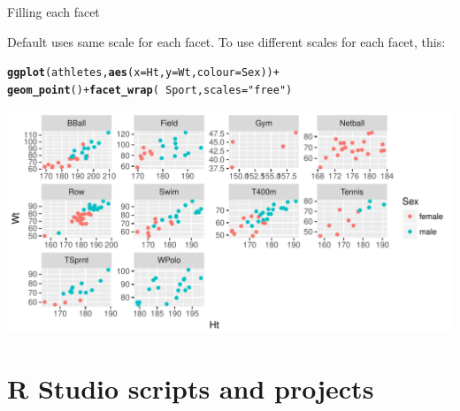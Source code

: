 \documentclass[unknownkeysallowed]{beamer}\usepackage[]{graphicx}\usepackage[]{color}
\makeatletter
\def\maxwidth{ %
  \ifdim\Gin@nat@width>\linewidth
    \linewidth
  \else
    \Gin@nat@width
  \fi
}
\newcommand{\hlstr}[1]{\textcolor[rgb]{0.192,0.494,0.8}{#1}}%
\newcommand{\hlopt}[1]{\textcolor[rgb]{0,0,0}{#1}}%
\newcommand{\hlstd}[1]{\textcolor[rgb]{0.345,0.345,0.345}{#1}}%
\newcommand{\hlkwc}[1]{\textcolor[rgb]{0.333,0.667,0.333}{#1}}%
\newcommand{\hlkwd}[1]{\textcolor[rgb]{0.737,0.353,0.396}{\textbf{#1}}}%
\newenvironment{kframe}{%
 \def\at@end@of@kframe{}%
 \ifinner\ifhmode%
  \def\at@end@of@kframe{\end{minipage}}%
  \begin{minipage}{\columnwidth}%
 \fi\fi%
 \def\FrameCommand##1{\hskip\@totalleftmargin \hskip-\fboxsep
 \colorbox{shadecolor}{##1}\hskip-\fboxsep
     \hskip-\linewidth \hskip-\@totalleftmargin \hskip\columnwidth}%
 \MakeFramed {\advance\hsize-\width
   \@totalleftmargin\z@ \linewidth\hsize
   \@setminipage}}%
 {\par\unskip\endMakeFramed%
 \at@end@of@kframe}
\newenvironment{knitrout}{}{} %
\makeatother
\begin{document}
\begin{frame}[fragile]{Filling each facet}
  
  Default uses same scale for each facet. To use different scales for
  each facet, this:
  
\begin{knitrout}
\color{fgcolor}\begin{kframe}
\begin{alltt}
\hlkwd{ggplot}\hlstd{(athletes,}\hlkwd{aes}\hlstd{(}\hlkwc{x}\hlstd{=Ht,}\hlkwc{y}\hlstd{=Wt,}\hlkwc{colour}\hlstd{=Sex))}\hlopt{+}
  \hlkwd{geom_point}\hlstd{()}\hlopt{+}\hlkwd{facet_wrap}\hlstd{(}\hlopt{~}\hlstd{Sport,}\hlkwc{scales}\hlstd{=}\hlstr{"free"}\hlstd{)}
\end{alltt}
\end{kframe}
\includegraphics[width=\maxwidth]{figure/unnamed-chunk-36-1} 

\end{knitrout}
  
  
\end{frame}



\section{R Studio scripts and projects}

\frame{\sectionpage}
\end{document}
